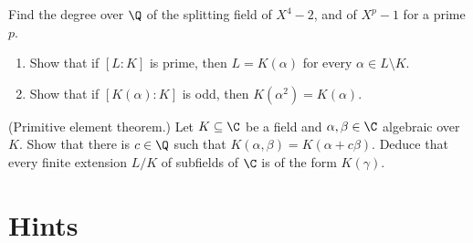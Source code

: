 \begin{exercise}[$\star\star$]\label{ex:splitdeg}
Find the degree over $\Q$ of the splitting field of $X^4-2$, and of $X^p-1$ for a prime $p$.
\end{exercise}

\begin{exercise}[$\star\star$]\label{ex:oddeg}
\begin{enumerate}[label=(\alph*)]
\item Show that if $[L:K]$ is prime, then $L=K(\alpha)$ for every $\alpha\in L\setminus K$.
\item Show that if $[K(\alpha):K]$ is odd, then $K(\alpha^2)=K(\alpha)$.
\end{enumerate}
\end{exercise}

\begin{exercise}[$\star\star\star$]\label{ex:primitive}
(Primitive element theorem.) Let $K\subseteq\C$ be a field and $\alpha,\beta\in\C$ algebraic over $K$. Show that there is $c\in\Q$ such that $K(\alpha,\beta)=K(\alpha+c\beta)$. Deduce that every finite extension $L/K$ of subfields of $\C$ is of the form $K(\gamma)$.
\end{exercise}

\section{Hints}

